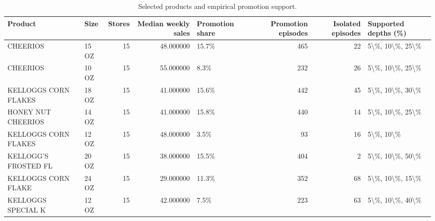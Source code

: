 \begin{table}
\caption{Selected products and empirical promotion support.}
\label{tab:product_characteristics}
\begin{tabular}{llrrlrrl}
\toprule
Product & Size & Stores & Median weekly sales & Promotion share & Promotion episodes & Isolated episodes & Supported depths (\%) \\
\midrule
CHEERIOS & 15 OZ & 15 & 48.000000 & 15.7\% & 465 & 22 & 5\textbackslash \%, 10\textbackslash \%, 25\textbackslash \% \\
CHEERIOS & 10 OZ & 15 & 55.000000 & 8.3\% & 232 & 26 & 5\textbackslash \%, 10\textbackslash \%, 25\textbackslash \% \\
KELLOGGS CORN FLAKES & 18 OZ & 15 & 41.000000 & 15.6\% & 442 & 45 & 5\textbackslash \%, 10\textbackslash \%, 30\textbackslash \% \\
HONEY NUT CHEERIOS & 14 OZ & 15 & 41.000000 & 15.8\% & 440 & 14 & 5\textbackslash \%, 10\textbackslash \%, 25\textbackslash \% \\
KELLOGGS CORN FLAKES & 12 OZ & 15 & 48.000000 & 3.5\% & 93 & 16 & 5\textbackslash \%, 10\textbackslash \% \\
KELLOGG'S FROSTED FL & 20 OZ & 15 & 38.000000 & 15.5\% & 404 & 2 & 5\textbackslash \%, 10\textbackslash \%, 50\textbackslash \% \\
KELLOGGS CORN FLAKE & 24 OZ & 15 & 29.000000 & 11.3\% & 352 & 68 & 5\textbackslash \%, 10\textbackslash \%, 15\textbackslash \% \\
KELLOGGS SPECIAL K & 12 OZ & 15 & 42.000000 & 7.5\% & 223 & 63 & 5\textbackslash \%, 10\textbackslash \%, 40\textbackslash \% \\
\bottomrule
\end{tabular}
\end{table}
